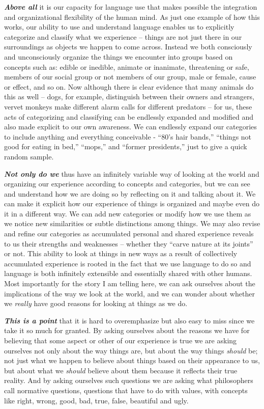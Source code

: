 \documentclass[12pt, openany]{book}
\begin{document}
\textbf{\emph{Above all}} it is our capacity for language use that makes possible the integration and organizational flexibility of the human mind. As just one example of how this works, our ability to use and understand language enables us to explicitly categorize and classify what we experience -- things are not just there in our surroundings as objects we happen to come across. Instead we both consciously and unconsciously organize the things we encounter into groups based on concepts such as: edible or inedible, animate or inanimate, threatening or safe, members of our social group or not members of our group, male or female, cause or effect, and so on. Now although there is clear evidence that many animals do this as well -- dogs, for example, distinguish between their owners and strangers, vervet monkeys make different alarm calls for different predators -- for us, these acts of categorizing and classifying can be endlessly expanded and modified and also made explicit to our own awareness. We can endlessly expand our categories to include anything and everything conceivable - ``80's hair bands,'' ``things not good for eating in bed,'' ``mops,'' and ``former presidents,'' just to give a quick random sample.

\textbf{\emph{Not only do we}} thus have an infinitely variable way of looking at the world and organizing our experience according to concepts and categories, but we can see and understand how we are doing so by reflecting on it and talking about it. We can make it explicit how our experience of things is organized and maybe even do it in a different way. We can add new categories or modify how we use them as we notice new similarities or subtle distinctions among things. We may also revise and refine our categories as accumulated personal and shared experience reveals to us their strengths and weaknesses -- whether they ``carve nature at its joints'' or not. This ability to look at things in new ways as a result of collectively accumulated experience is rooted in the fact that we use language to do so and language is both infinitely extensible and essentially shared with other humans. Most importantly for the story I am telling here, we can ask ourselves about the implications of the way we look at the world, and we can wonder about whether we \emph{really} have good reasons for looking at things as we do.

\textbf{\emph{This is a point}} that it is hard to overemphasize but also easy to miss since we take it so much for granted. By asking ourselves about the reasons we have for believing that some aspect or other of our experience is true we are asking ourselves not only about the way things are, but about the way things \emph{should} be; not just what we happen to believe about things based on their appearance to us, but about what we \emph{should} believe about them because it reflects their true reality. And by asking ourselves such questions we are asking what philosophers call normative questions, questions that have to do with values, with concepts like right, wrong, good, bad, true, false, beautiful and ugly.
\end{document}
